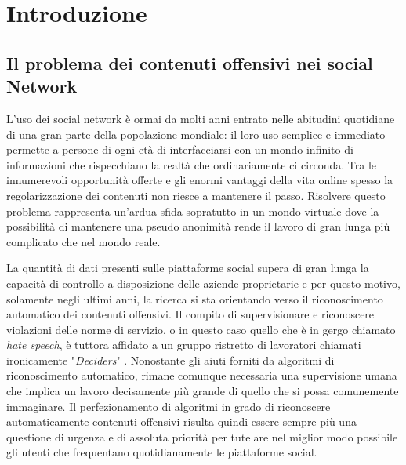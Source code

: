 \chapter{Introduzione}
\hspace{0,5cm} 
\section{Il problema dei contenuti offensivi nei social Network}

L'uso dei social network è ormai da molti anni entrato nelle abitudini quotidiane di una gran parte della popolazione mondiale: il loro uso semplice e immediato permette a persone di ogni età di interfacciarsi con un mondo infinito di informazioni che rispecchiano la realtà che ordinariamente ci circonda. Tra le innumerevoli opportunità offerte e gli enormi vantaggi della vita online spesso la regolarizzazione dei contenuti non riesce a mantenere il passo. Risolvere questo problema rappresenta un'ardua sfida sopratutto in un mondo virtuale dove la possibilità di mantenere una pseudo anonimità rende il lavoro di gran lunga più complicato che nel mondo reale.

La quantità di dati presenti sulle piattaforme social supera di gran lunga la capacità di controllo a disposizione delle aziende proprietarie e per questo motivo, solamente negli ultimi anni, la ricerca si sta orientando verso il riconoscimento automatico dei contenuti offensivi. Il compito di supervisionare e riconoscere violazioni delle norme di servizio, o in questo caso quello che è in gergo chiamato \textit{hate speech}, è tuttora affidato a un gruppo ristretto di lavoratori chiamati ironicamente "\textit{Deciders}" \cite{Deciders}. Nonostante gli aiuti forniti da algoritmi di riconoscimento automatico, rimane comunque necessaria una supervisione umana che implica un lavoro decisamente più grande di quello che si possa comunemente immaginare. Il perfezionamento di algoritmi in grado di riconoscere automaticamente contenuti offensivi risulta quindi essere sempre più una questione di urgenza e di assoluta priorità per tutelare nel miglior modo possibile gli utenti che frequentano quotidianamente le piattaforme social.



